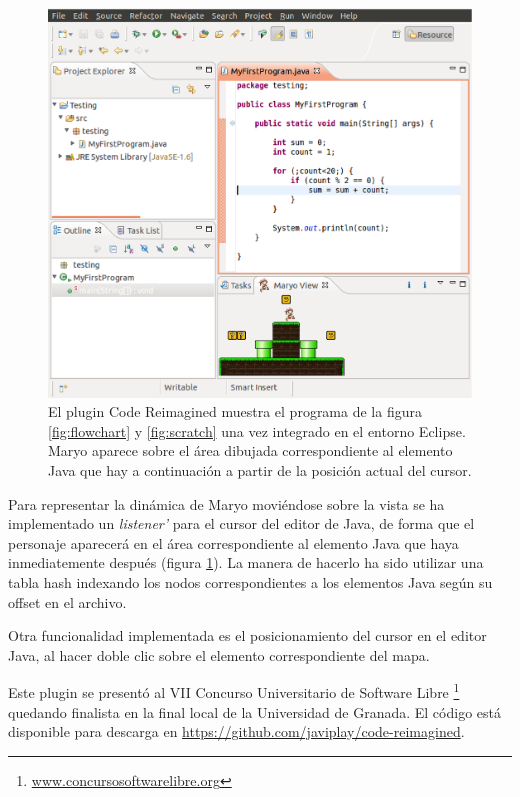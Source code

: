 \documentclass{llncs}
\begin{document}
\begin{figure}[ht]
\begin{center}
\includegraphics[scale=0.4]{images/eclipse.eps}
\caption{El plugin Code Reimagined muestra el programa de la figura \ref{fig:flowchart} y \ref{fig:scratch} una vez integrado en el entorno Eclipse. Maryo aparece sobre el área dibujada correspondiente al elemento Java que hay a continuación a partir de la posición actual del cursor.
\label{fig:eclipse}}
\end{center}
\end{figure}

Para representar la dinámica de Maryo moviéndose sobre la vista se ha
implementado un {\em listener'} %
 para el cursor del editor de Java, de forma que el personaje aparecerá en el área correspondiente al elemento Java que haya inmediatemente después (figura \ref{fig:eclipse}). La manera de hacerlo ha sido utilizar una tabla hash indexando los nodos correspondientes a los elementos Java según su offset en el archivo.

Otra funcionalidad implementada es el posicionamiento del cursor en el editor Java, al hacer doble clic sobre el elemento correspondiente del mapa.

Este plugin se presentó al VII Concurso Universitario de Software Libre \footnote{\url{www.concursosoftwarelibre.org}} quedando finalista en la final local de la Universidad de Granada. El código está disponible para descarga en \url{https://github.com/javiplay/code-reimagined}.
\end{document}
